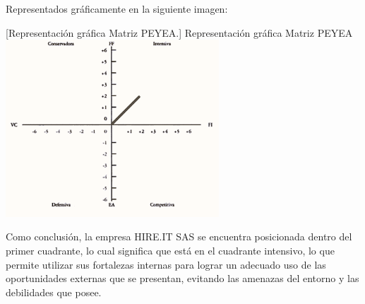 Representados gráficamente en la siguiente imagen:

\vspace{2mm}
\begin{minipage}{0.9\textwidth}
\centering
{}[{Representación gráfica Matriz PEYEA.}]{ Representación gráfica Matriz PEYEA }
\label{peyeagrafico}
\includegraphics[width=0.6\textwidth]{Images/PEYEA.png}
\end{minipage}

Como conclusión, la empresa HIRE.IT SAS se encuentra posicionada dentro del primer cuadrante, lo cual significa que está en el cuadrante intensivo, lo que permite utilizar sus fortalezas internas para lograr un adecuado uso de las oportunidades externas que se presentan, evitando las amenazas del entorno y las debilidades que posee.